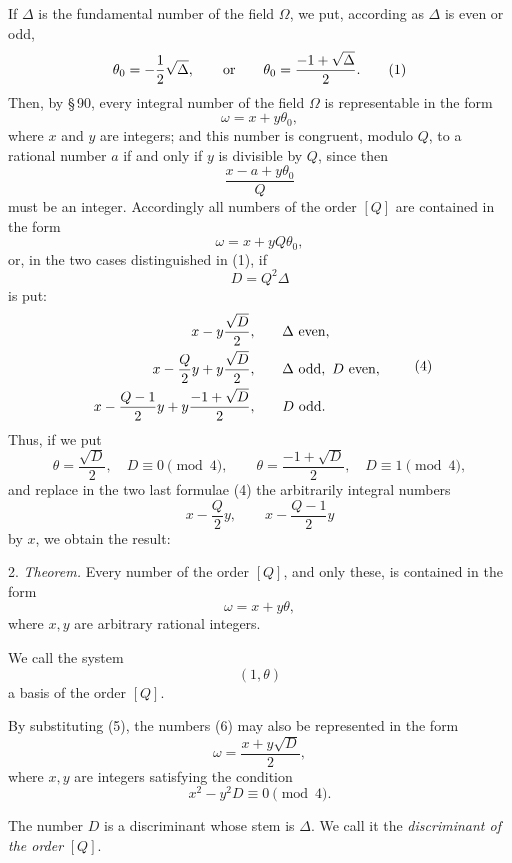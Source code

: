 \documentclass[11pt]{article}
\begin{document}
If $\Delta$ is the fundamental number of the field $\Omega$, we put, according as $\Delta$ is even or odd,
\begin{equation}
 \theta_0=-\frac{1}{2}\sqrt{\Delta},
 \qquad\hbox{or}\qquad
 \theta_0=\frac{-1+\sqrt{\Delta}}{2}.
\tag{1}
\end{equation}
Then, by \S\,90, every integral number of the field $\Omega$ is representable in the form
\begin{equation}
 \omega=x+y\theta_0,
\tag{2}
\end{equation}
where $x$ and $y$ are integers; and this number is congruent, modulo $Q$, to a rational number $a$ if and only if $y$ is divisible by $Q$, since then
\[
 \frac{x-a+y\theta_0}{Q}
\]
must be an integer. Accordingly all numbers of the order $[Q]$ are contained in the form
\[
 \omega=x+yQ\theta_0,
\]
or, in the two cases distinguished in (1), if
\begin{equation}
 D=Q^2\Delta
\tag{3}
\end{equation}
is put:
\begin{equation}
\begin{array}{rll}
 x-y\dfrac{\sqrt D}{2}, && \Delta\hbox{ even},\\[0.7em]
 x-\dfrac{Q}{2}y+y\dfrac{\sqrt D}{2}, && \Delta\hbox{ odd},\ D\hbox{ even},\\[0.7em]
 x-\dfrac{Q-1}{2}y+y\dfrac{-1+\sqrt D}{2}, && D\hbox{ odd}.
\end{array}
\tag{4}
\end{equation}
Thus, if we put
\begin{equation}
 \theta=\frac{\sqrt D}{2},\quad D\equiv0\pmod4,
 \qquad
 \theta=\frac{-1+\sqrt D}{2},\quad D\equiv1\pmod4,
\tag{5}
\end{equation}
and replace in the two last formulae (4) the arbitrarily integral numbers
\[
 x-\frac{Q}{2}y,
 \qquad x-\frac{Q-1}{2}y
\]
by $x$, we obtain the result:

2. \emph{Theorem.} Every number of the order $[Q]$, and only these, is contained in the form
\begin{equation}
 \omega=x+y\theta,
\tag{6}
\end{equation}
where $x,y$ are arbitrary rational integers.

We call the system
\begin{equation}
 (1,\theta)
\tag{7}
\end{equation}
a basis of the order $[Q]$.

By substituting (5), the numbers (6) may also be represented in the form
\begin{equation}
 \omega=\frac{x+y\sqrt D}{2},
\tag{8}
\end{equation}
where $x,y$ are integers satisfying the condition
\begin{equation}
 x^2-y^2D\equiv0\pmod4.
\tag{9}
\end{equation}

The number $D$ is a discriminant whose stem is $\Delta$. We call it the \emph{discriminant of the order} $[Q]$.
\end{document}

